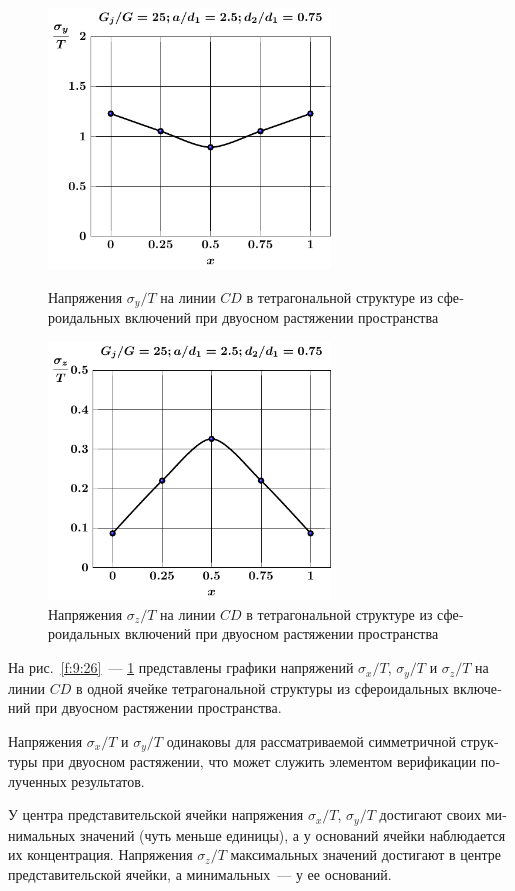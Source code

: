 \begin{russian}
\begin{figure}[h!]
\centering\footnotesize
\parbox[b]{7.5cm}{\centering\includegraphics[width=7.5cm]{inc8-a25-d75-g25-c-c-sig_y-spheroids-tension2.pdf}
\caption{Напряжения $\sigma_y/T$ на линии $CD$ в тетрагональной структуре из сфероидальных включений при двуосном растяжении пространства
\label{f:9:27}}}\hfil\hfil
\parbox[b]{7.5cm}{\centering\includegraphics[width=7.5cm]{inc8-a25-d75-g25-c-c-sig_z-spheroids-tension2.pdf}
\caption{Напряжения $\sigma_z/T$ на линии $CD$ в тетрагональной структуре из сфероидальных включений при двуосном растяжении пространства
\label{f:9:28}}}
\end{figure}

На рис.~\ref{f:9:26}~--- \ref{f:9:28} представлены графики напряжений $\sigma_x/T$, $\sigma_y/T$ и $\sigma_z/T$ на линии $CD$ в одной ячейке тетрагональной структуры из сфероидальных включений при двуосном растяжении пространства.{\sloppy\par}

Напряжения $\sigma_x/T$ и $\sigma_y/T$ одинаковы для рассматриваемой симметричной структуры при двуосном растяжении, что может служить элементом верификации полученных результатов.

У центра представительской ячейки напряжения $\sigma_x/T$, $\sigma_y/T$ достигают своих минимальных значений (чуть меньше единицы), а у оснований ячейки наблюдается их концентрация. Напряжения $\sigma_z/T$ максимальных значений достигают в центре представительской ячейки, а минимальных~--- у ее оснований.


\end{russian}
